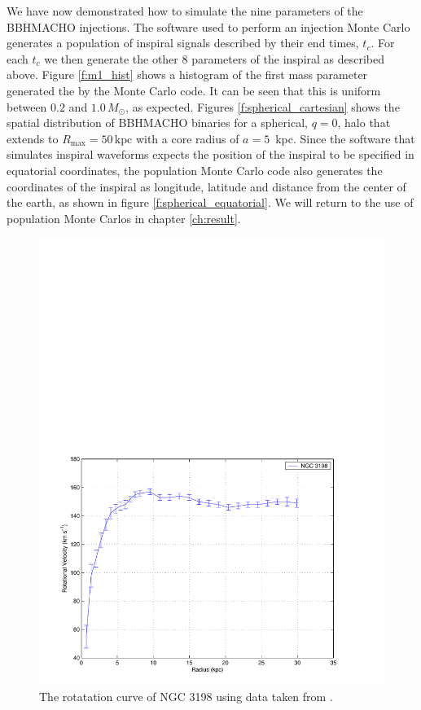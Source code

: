 We have now demonstrated how to simulate the nine parameters of the BBHMACHO
injections. The software used to perform an injection Monte Carlo generates a
population of inspiral signals described by their end times, $t_c$. For each
$t_c$ we then generate the other 8 parameters of the inspiral as described
above. Figure \ref{f:m1_hist} shows a histogram of the first mass parameter
generated the by the Monte Carlo code. It can be seen that this is uniform
between $0.2$ and $1.0\,M_\odot$, as expected. Figures
\ref{f:spherical_cartesian} shows the spatial distribution of BBHMACHO
binaries for a spherical, $q=0$, halo that extends to $R_\mathrm{max} =
50\,\mathrm{kpc}$ with a core radius of $a = 5$~kpc.  Since the software that
simulates inspiral waveforms expects the position of the inspiral to be
specified in equatorial coordinates, the population Monte Carlo code also
generates the coordinates of the inspiral as longitude, latitude and distance
from the center of the earth, as shown in figure \ref{f:spherical_equatorial}.
We will return to the use of population Monte Carlos in chapter
\ref{ch:result}.

\newpage

\begin{figure}[p]
\begin{center}
\includegraphics[width=\linewidth]{figures/macho/ngc3198}
\end{center}
\caption{\label{f:rotcurves}%
The rotatation curve of NGC 3198 using data taken from \cite{1989A&A...223...47B}.
}
\end{figure}

